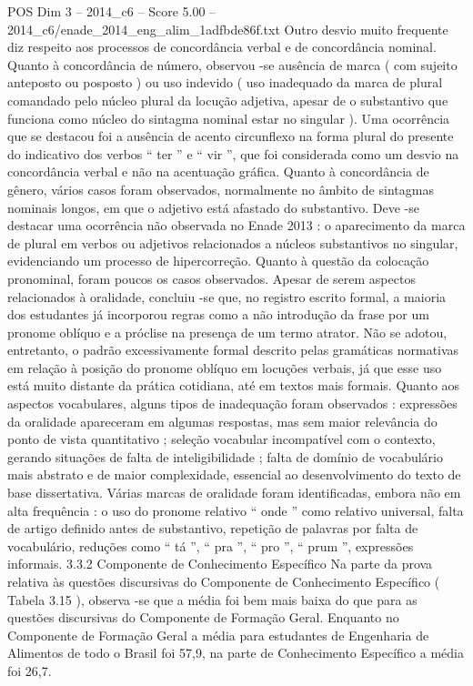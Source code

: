\begin{textsample}{POS Dim 3 – 2014\_c6 – Score 5.00 – 2014\_c6/enade\_2014\_eng\_alim\_1adfbde86f.txt}
Outro desvio muito frequente diz respeito aos processos de concordância verbal e de concordância nominal.
Quanto à concordância de número, observou -se ausência de marca ( com sujeito anteposto ou posposto ) ou uso indevido ( uso inadequado da marca de plural comandado pelo núcleo plural da locução adjetiva, apesar de o substantivo que funciona como núcleo do sintagma nominal estar no singular ).
Uma ocorrência que se destacou foi a ausência de acento circunflexo na forma plural do presente do indicativo dos verbos “ ter ” e “ vir ”, que foi considerada como um desvio na concordância verbal e não na acentuação gráfica.
Quanto à concordância de gênero, vários casos foram observados, normalmente no âmbito de sintagmas nominais longos, em que o adjetivo está afastado do substantivo.
Deve -se destacar uma ocorrência não observada no Enade 2013 : o aparecimento da marca de plural em verbos ou adjetivos relacionados a núcleos substantivos no singular, evidenciando um processo de hipercorreção.
Quanto à questão da colocação pronominal, foram poucos os casos observados.
Apesar de serem aspectos relacionados à oralidade, concluiu -se que, no registro escrito formal, a maioria dos estudantes já incorporou regras como a não introdução da frase por um pronome oblíquo e a próclise na presença de um termo atrator.
Não se adotou, entretanto, o padrão excessivamente formal descrito pelas gramáticas normativas em relação à posição do pronome oblíquo em locuções verbais, já que esse uso está muito distante da prática cotidiana, até em textos mais formais.
Quanto aos aspectos vocabulares, alguns tipos de inadequação foram observados : expressões da oralidade apareceram em algumas respostas, mas sem maior relevância do ponto de vista quantitativo ; seleção vocabular incompatível com o contexto, gerando situações de falta de inteligibilidade ; falta de domínio de vocabulário mais abstrato e de maior complexidade, essencial ao desenvolvimento do texto de base dissertativa.
Várias marcas de oralidade foram identificadas, embora não em alta frequência : o uso do pronome relativo “ onde ” como relativo universal, falta de artigo definido antes de substantivo, repetição de palavras por falta de vocabulário, reduções como “ tá ”, “ pra ”, “ pro ”, “ prum ”, expressões informais. 3.3.2 Componente de Conhecimento Específico Na parte da prova relativa às questões discursivas do Componente de Conhecimento Específico ( Tabela 3.15 ), observa -se que a média foi bem mais baixa do que para as questões discursivas do Componente de Formação Geral.
Enquanto no Componente de Formação Geral a média para estudantes de Engenharia de Alimentos de todo o Brasil foi 57,9, na parte de Conhecimento Específico a média foi 26,7.

\end{textsample}
